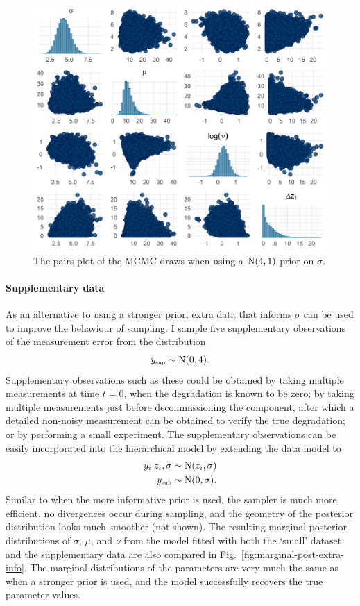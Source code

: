\begin{figure}
  \centering
  \includegraphics[width=0.8\columnwidth]{./figures/ch-4/strong-prior-pairs.png}
  \caption{The pairs plot of the MCMC draws when using a $\hbox{N}(4, 1)$ prior on $\sigma$.}
  \label{fig:pairs-strong-prior}
\end{figure}

\paragraph*{Supplementary data}

As an alternative to using a stronger prior, extra data that informs $\sigma$ can be used to improve the behaviour of sampling. I sample five supplementary observations of the measurement error from the distribution
\begin{equation*}
 y_{\text{\tiny{sup}}} \sim \mbox{N}(0, 4).
\end{equation*}
Supplementary observations such as these could be obtained by taking multiple measurements at time $t = 0$, when the degradation is known to be zero; by taking multiple measurements just before decommissioning the component, after which a detailed non-noisy measurement can be obtained to verify the true degradation; or by performing a small experiment. The supplementary observations can be easily incorporated into the hierarchical model by extending the data model to
\begin{align*}
 y_i|z_i, \sigma & \sim \mbox{N}(z_i, \sigma) \\
 y_{\text{\tiny{sup}}} & \sim \mbox{N}(0, \sigma).
\end{align*}
Similar to when the more informative prior is used, the sampler is much more efficient, no divergences occur during sampling, and the geometry of the posterior distribution looks much smoother (not shown). The resulting marginal posterior distributions of $\sigma$, $\mu$, and $\nu$ from the model fitted with both the `small' dataset and the supplementary data are also compared in Fig.~\ref{fig:marginal-post-extra-info}. The marginal distributions of the parameters are very much the same as when a stronger prior is used, and the model successfully recovers the true parameter values.

